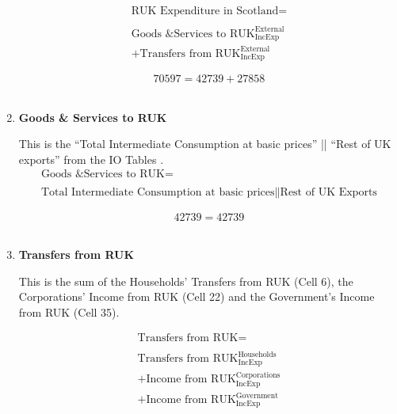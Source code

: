 \begin{enumerate}
\begin{equation}
\begin{split}
\text{RUK Expenditure in Scotland} =  \\ \\
\text{Goods \& Services to RUK}^\text{External}_\text{IncExp}\\
+\text{Transfers from RUK}^\text{External}_\text{IncExp}
\end{split} \label{eq:2.5.62}
\end{equation}

\begin{equation} \nonumber
70597 = 42739+27858
\end{equation}\\


\item \textbf {Goods \& Services to RUK}

This is the ``Total Intermediate Consumption at basic prices'' || ``Rest of UK exports'' from the IO Tables \cite{ScotGov2013a}.\\

\begin{equation}
\begin{split}
\text{Goods \& Services to RUK} =  \\ \\
\text{Total Intermediate Consumption at basic prices}\|\text{Rest of UK Exports}
\end{split} \label{eq:2.5.63}
\end{equation}

\begin{equation} \nonumber
42739 = 42739
\end{equation}\\

\newpage

\item \textbf {Transfers from RUK}

This is the sum of the Households' Transfers from RUK (Cell 6), the Corporations' Income from RUK (Cell 22) and the Government's Income from RUK (Cell 35).

\begin{equation}
\begin{split}
\text{Transfers from RUK} =  \\ \\
\text{Transfers from RUK}^\text{Households}_\text{IncExp}\\
+\text{Income from RUK}^\text{Corporations}_\text{IncExp}\\
+\text{Income from RUK}^\text{Government}_\text{IncExp}
\end{split} \label{eq:2.5.64}
\end{equation}


\end{enumerate}
